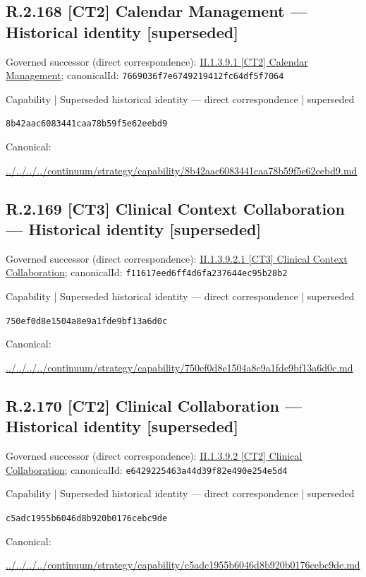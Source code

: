 \documentclass[10pt,a4paper]{article}
\begin{document}
\subsection*{R.2.168 [CT2] Calendar Management — Historical identity [superseded]}
Governed successor (direct correspondence): \hyperref[element-7669036f7e6749219412fc64df5f7064]{II.1.3.9.1 [CT2] Calendar Management}; canonicalId: \texttt{7669036f7e6749219412fc64df5f7064}\par
\label{element-8b42aac6083441caa78b59f5e62eebd9}
{\small Capability | Superseded historical identity — direct correspondence | superseded}\par
\texttt{8b42aac6083441caa78b59f5e62eebd9}\par
Canonical: \par
{\footnotesize\url{../../../../continuum/strategy/capability/8b42aac6083441caa78b59f5e62eebd9.md}}\par
\subsection*{R.2.169 [CT3] Clinical Context Collaboration — Historical identity [superseded]}
Governed successor (direct correspondence): \hyperref[element-f11617eed6ff4d6fa237644ec95b28b2]{II.1.3.9.2.1 [CT3] Clinical Context Collaboration}; canonicalId: \texttt{f11617eed6ff4d6fa237644ec95b28b2}\par
\label{element-750ef0d8e1504a8e9a1fde9bf13a6d0c}
{\small Capability | Superseded historical identity — direct correspondence | superseded}\par
\texttt{750ef0d8e1504a8e9a1fde9bf13a6d0c}\par
Canonical: \par
{\footnotesize\url{../../../../continuum/strategy/capability/750ef0d8e1504a8e9a1fde9bf13a6d0c.md}}\par
\subsection*{R.2.170 [CT2] Clinical Collaboration — Historical identity [superseded]}
Governed successor (direct correspondence): \hyperref[element-e6429225463a44d39f82e490e254e5d4]{II.1.3.9.2 [CT2] Clinical Collaboration}; canonicalId: \texttt{e6429225463a44d39f82e490e254e5d4}\par
\label{element-c5adc1955b6046d8b920b0176cebc9de}
{\small Capability | Superseded historical identity — direct correspondence | superseded}\par
\texttt{c5adc1955b6046d8b920b0176cebc9de}\par
Canonical: \par
{\footnotesize\url{../../../../continuum/strategy/capability/c5adc1955b6046d8b920b0176cebc9de.md}}\par
\end{document}
